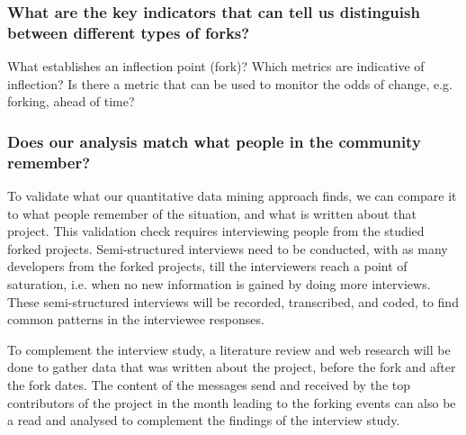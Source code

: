 \documentclass{acm_proc_article-sp}
\begin{document}
\subsubsection{What are the key indicators that can tell us distinguish between different types of forks?\\}

What establishes an inflection point (fork)? Which metrics are indicative of inflection? Is there a metric that can be used to monitor the odds of change, e.g. forking, ahead of time?


\subsubsection{Does our analysis match what people in the community remember?\\} 

To validate what our quantitative data mining approach finds, we can compare it to what people remember of the situation, and what is written about that project. This validation check requires interviewing people from the studied forked projects. Semi-structured interviews need to be conducted, with as many developers from the forked projects, till the interviewers reach a point of saturation, i.e. when no new information is gained by doing more interviews. These semi-structured interviews will be recorded, transcribed, and coded, to find common patterns in the interviewee responses.

To complement the interview study, a literature review and web research will be done to gather data that was written about the project, before the fork and after the fork dates. The content of the messages send and received by the top contributors of the project in the month leading to the forking events can also be a read and analysed to complement the findings of the interview study. 
\end{document}
